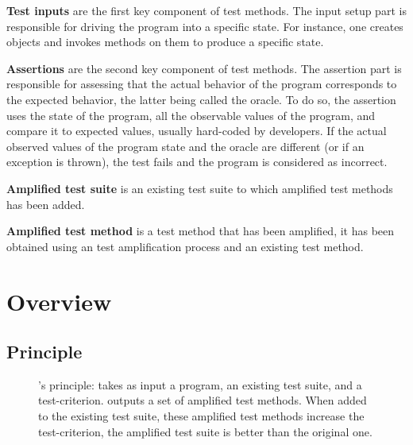 \textbf{Test inputs} are the first key component of test methods. 
The input setup part is responsible for driving the program into a specific state.
For instance, one creates objects and invokes methods on them to produce a specific state.

\textbf{Assertions} are the second key component of test methods. 
The assertion part is responsible for assessing that the actual behavior of the program corresponds to the expected behavior, the latter being called the oracle.
To do so, the assertion uses the state of the program, \ie all the observable values of the program, and compare it to expected values, usually hard-coded by developers.
If the actual observed values of the program state and the oracle are different (or if an exception is thrown), the test fails and the program is considered as incorrect.

\textbf{Amplified test suite} is an existing test suite to which amplified test methods has been added.

\textbf{Amplified test method} is a test method that has been amplified, \ie it has been obtained using an test amplification process and an existing test method.

\section{Overview}
\label{sec:dspot:overview}

\subsection{Principle}
\label{subsec:dspot:overview:principle}

\begin{figure}[h]
	\centering
	\caption{
		\dspot's principle: \dspot takes as input a program, an existing test suite, and a test-criterion. 
		\dspot outputs a set of amplified test methods.
		When added to the existing test suite, these amplified test methods increase the test-criterion, \ie the amplified test suite is better than the original one.
	}
	\label{fig:dspot:principle}
\end{figure}


